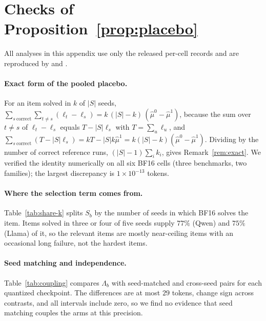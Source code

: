 \documentclass[11pt,a4paper]{article}
\begin{document}
\section{Checks of Proposition~\ref{prop:placebo}}
\label{app:prop-checks}
All analyses in this appendix use only the released per-cell records and are reproduced by  and .

\paragraph{Exact form of the pooled placebo.} For an item solved in $k$ of $|S|$ seeds, $\sum_{s\ \mathrm{correct}}\sum_{t\neq s}(\ell_t-\ell_s)=k\,(|S|-k)\,(\hat\mu^{0}-\hat\mu^{1})$, because the sum over $t\neq s$ of $\ell_t-\ell_s$ equals $T-|S|\ell_s$ with $T=\sum_u\ell_u$, and $\sum_{s\ \mathrm{correct}}(T-|S|\ell_s)=kT-|S|k\hat\mu^{1}=k(|S|-k)(\hat\mu^{0}-\hat\mu^{1})$. Dividing by the number of correct reference runs, $(|S|-1)\sum_i k_i$, gives Remark~\ref{rem:exact}. We verified the identity numerically on all six BF16 cells (three benchmarks, two families); the largest discrepancy is $1\times10^{-13}$ tokens.

\paragraph{Where the selection term comes from.} Table~\ref{tab:share-k} splits $S_b$ by the number of seeds in which BF16 solves the item. Items solved in three or four of five seeds supply $77\%$ (Qwen) and $75\%$ (Llama) of it, so the relevant items are mostly near-ceiling items with an occasional long failure, not the hardest items.



\paragraph{Seed matching and independence.} Table~\ref{tab:coupling} compares $\Lambda_b$ with seed-matched and cross-seed pairs for each quantized checkpoint. The differences are at most $29$ tokens, change sign across contrasts, and all intervals include zero, so we find no evidence that seed matching couples the arms at this precision.


\end{document}
